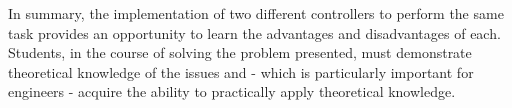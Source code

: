 \documentclass[conference]{IEEEtran}
\begin{document}
In summary, the implementation of two different controllers to perform the same task provides an opportunity to learn the advantages and disadvantages of each. Students, in the course of solving the problem presented, must demonstrate theoretical knowledge of the issues and - which is particularly important for engineers - acquire the ability to practically apply theoretical knowledge. 




\end{document}
